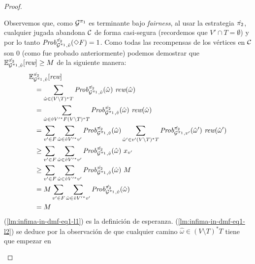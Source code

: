 \begin{proof}
\begin{proofofclaim}
    Observemos que, como $\mathcal{G}^{\pi_{1}}$ es terminante bajo \textit{fairness},
    al usar la estrategia $\hat{\pi_{2}}$, cualquier jugada abandona $\mathcal{C}$ de forma casi-segura (recordemos que $V' \cap T = \emptyset$) y por lo tanto
    $\mathit{Prob}^{\hat{\pi_{2}}}_{\mathcal{G}^{\pi_{1}},\hat{v}} (\Diamond F) = 1$.
    Como todas las recompensas de los vértices en $\mathcal{C}$ son $0$ (como fue probado anteriormente) podemos demostrar que
    $\mathbb{E}^{\hat{\pi_{2}}}_{\mathcal{G}^{\pi_{1}},\hat{v}}[\textit{rew}]
    \geq M$ de la siguiente manera:
    \begin{align}	
      \ExpectMDP{\hat{\strat{2}}}_{\StochG^{\strat{1}},\hat{v}}[\Rewards] \hspace{-4em} & \notag\\
      \label{lm:infima-in-dmf-eq1-l1}
      &= \sum_{\hat{\omega} \in (V \setminus T)^*T} \MDPProb{\hat{\strat{2}}}_{\StochG^{\strat{1}},\hat{v}}(\hat{\omega})\ \Rewards(\hat{\omega}) \\
      \label{lm:infima-in-dmf-eq1-l2}
      &=\sum_{\hat{\omega} \in \hat{v}{V'}^*F(V \setminus T)^*T} \MDPProb{\hat{\strat{2}}}_{\StochG^{\strat{1}},\hat{v}}(\hat{\omega})\ \Rewards(\hat{\omega}) \\
      \label{lm:infima-in-dmf-l3}
      &= \sum_{v' \in F} \sum_{\hat{\omega} \in \hat{v}{V'}^*v'} \MDPProb{\hat{\strat{2}}}_{\StochG^{\strat{1}},\hat{v}}(\hat{\omega}) \sum_{\hat{\omega}' \in v' (V \setminus T)^*T}  \MDPProb{\hat{\strat{2}}}_{\StochG^{\strat{1}},v'}(\hat{\omega}')\ \Rewards(\hat{\omega}')\\
      \label{lm:infima-in-dmf-l4}
      &\geq \sum_{v' \in F} \sum_{\hat{\omega} \in \hat{v}{V'}^*v'} \MDPProb{\hat{\strat{2}}}_{\StochG^{\strat{1}},\hat{v}}(\hat{\omega})\ x_{v'} \\
      \label{lm:infima-in-dmf-l5}
      &\geq \sum_{v' \in F} \sum_{\hat{\omega} \in \hat{v}{V'}^*v'} \MDPProb{\hat{\strat{2}}}_{\StochG^{\strat{1}},\hat{v}}(\hat{\omega})\ M \\
      \label{lm:infima-in-dmf-l6}
      &= M  \sum_{v' \in F} \sum_{\hat{\omega} \in \hat{v}{V'}^*v'} \MDPProb{\hat{\strat{2}}}_{\StochG^{\strat{1}},\hat{v}}(\hat{\omega}) \\
      \label{lm:infima-in-dmf-l7}
      &= M
    \end{align}
    (\ref{lm:infima-in-dmf-eq1-l1}) es la definición de esperanza.
    (\ref{lm:infima-in-dmf-eq1-l2}) se deduce por la observación de que cualquier camino $\hat{\omega} \in (V \setminus T)^*T$ tiene que empezar en

\end{proofofclaim}
\end{proof}
